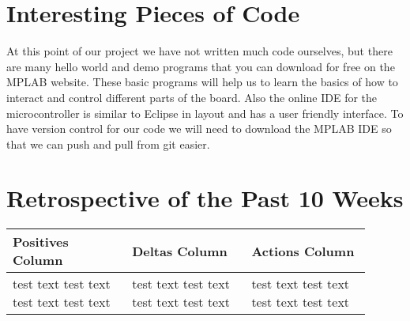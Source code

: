 \documentclass[10pt,draftclsnofoot,onecolumn]{IEEEtran}
\begin{document}
\section{Interesting Pieces of Code}
At this point of our project we have not written much code ourselves, but there are many hello world and demo programs that you can download for free on the MPLAB website.
These basic programs will help us to learn the basics of how to interact and control different parts of the board. 
Also the online IDE for the microcontroller is similar to Eclipse in layout and has a user friendly interface. 
To have version control for our code we will need to download the MPLAB IDE so that we can push and pull from git easier. 

\section{Retrospective of the Past 10 Weeks}
\begin{center}
\begin{tabular}{| p{0.3\linewidth} | p{0.3\linewidth} | p{0.3\linewidth} |}
\hline
Positives Column & 
Deltas Column & 
Actions Column \\
\hline
test text test text test text test text &
test text test text test text test text &
test text test text test text test text \\
\hline
\end{tabular}
\end{center}
\end{document}
